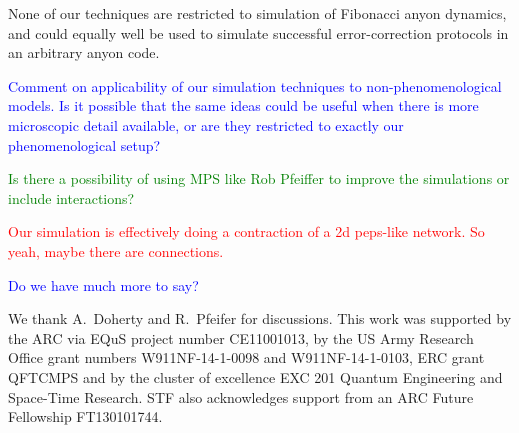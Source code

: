 \documentclass[aps, prl, letterpaper, twocolumn, superscriptaddress, notitlepage, 10pt]{revtex4-1}
\newcommand{\cggb}[1]{\textcolor{blue}{#1}}
\newcommand{\dude}[1]{\textcolor{red}{#1}}
\newcommand{\stf}[1]{\textcolor{green}{#1}}
\begin{document}
None of our techniques are restricted to simulation of Fibonacci anyon dynamics, and could 
equally well be used to simulate successful error-correction protocols in an arbitrary anyon 
code.	

\cggb{Comment on applicability of our simulation techniques to non-phenomenological 
models. Is it possible that the same ideas could be useful when there is more microscopic 
detail available, or are they restricted to exactly our phenomenological setup?}

\stf{Is there a possibility of using MPS like Rob Pfeiffer to improve the simulations or 
include interactions?}~\cite{Pfeifer2010, Pfeifer2012}


\dude{Our simulation is effectively doing a contraction of a 2d peps-like network. So
yeah, maybe there are connections.}

\cggb{Do we have much more to say?}


\acknowledgments 

We thank A.\ Doherty and R.\ Pfeifer for discussions. 
This work was supported by the ARC via EQuS project number CE11001013, by the US Army Research Office grant numbers W911NF-14-1-0098 and W911NF-14-1-0103, ERC grant QFTCMPS and by the cluster of excellence EXC 201 Quantum Engineering and Space-Time Research. STF also acknowledges support from an ARC Future Fellowship FT130101744.


\end{document}
